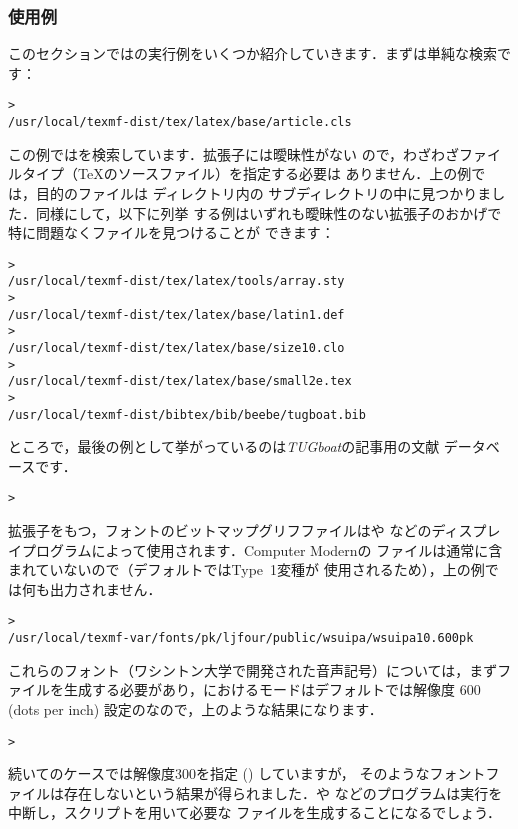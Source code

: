 \documentclass[uplatex,dvipdfmx]{jsarticle}
\begin{document}
\subsubsection{使用例}
\label{sec:examples-of-use}

このセクションでは\KPS の実行例をいくつか紹介していきます．まずは単純な検索です：
%
\begin{alltt}
> 
   /usr/local/texmf-dist/tex/latex/base/article.cls
\end{alltt}
%
この例ではを検索しています．拡張子には曖昧性がない
ので，わざわざファイルタイプ（\TeX のソースファイル）を指定する必要は
ありません．上の例では，目的のファイルは \TL ディレクトリ内の
サブディレクトリの中に見つかりました．同様にして，以下に列挙
する例はいずれも曖昧性のない拡張子のおかげで特に問題なくファイルを見つけることが
できます：
%
\begin{alltt}
> 
   /usr/local/texmf-dist/tex/latex/tools/array.sty
> 
   /usr/local/texmf-dist/tex/latex/base/latin1.def
> 
   /usr/local/texmf-dist/tex/latex/base/size10.clo
> 
   /usr/local/texmf-dist/tex/latex/base/small2e.tex
> 
   /usr/local/texmf-dist/bibtex/bib/beebe/tugboat.bib
\end{alltt}
%
ところで，最後の例として挙がっているのは\textsl{TUGboat}の記事用の\BibTeX 文献
データベースです．

\begin{alltt}
> 
\end{alltt}
%
拡張子をもつ，フォントのビットマップグリフファイルはや
などのディスプレイプログラムによって使用されます．Computer Modernの
ファイルは通常\TL に含まれていないので（デフォルトではType~1変種が
使用されるため），上の例では何も出力されません．

\begin{alltt}
> 
   /usr/local/texmf-var/fonts/pk/ljfour/public/wsuipa/wsuipa10.600pk
\end{alltt}
%
これらのフォント（ワシントン大学で開発された音声記号）については，まずファイルを生成する必要があり，\TL における\MF モードはデフォルトでは解像度
600{\dpi} (dots per inch) 設定のなので，上のような結果になります．
%
\begin{alltt}
> 
\end{alltt}
%
続いてのケースでは解像度300\dpi を指定 () していますが，
そのようなフォントファイルは存在しないという結果が得られました．や
などのプログラムは実行を中断し，スクリプトを用いて必要な
ファイルを生成することになるでしょう．
\end{document}
